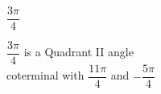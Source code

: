 {$\dfrac{3\pi}{4}$}
{ $\dfrac{3\pi}{4}$ is a Quadrant II angle\\
coterminal with $\dfrac{11\pi}{4}$ and $-\dfrac{5\pi}{4}$

\begin{center}
\end{center}}